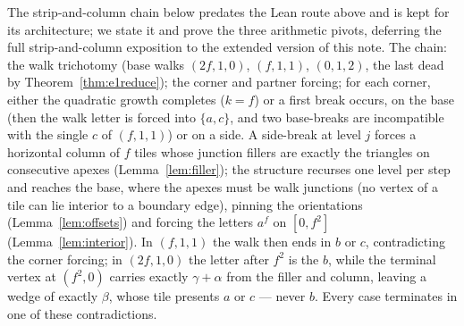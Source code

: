 \documentclass[11pt,reqno]{amsart}
\theoremstyle{plain}
\theoremstyle{definition}
\begin{document}
The strip-and-column chain below predates the Lean route above and is kept for its architecture;
we state it and prove the three
arithmetic pivots, deferring the full strip-and-column exposition to the extended version of this
note. The chain: the walk trichotomy (base walks $(2f,1,0)$, $(f,1,1)$, $(0,1,2)$, the last dead
by Theorem~\ref{thm:e1reduce}); the corner and partner forcing; for each corner, either the
quadratic growth completes ($k=f$) or a first break occurs, on the base (then the walk letter is
forced into $\{a,c\}$, and two base-breaks are incompatible with the single $c$ of $(f,1,1)$) or
on a side. A side-break at level $j$ forces a horizontal column of $f$ tiles whose junction
fillers are exactly the triangles on consecutive apexes (Lemma~\ref{lem:filler}); the structure
recurses one level per step and reaches the base, where the apexes must be walk junctions (no
vertex of a tile can lie interior to a boundary edge), pinning the orientations
(Lemma~\ref{lem:offsets}) and forcing the letters $a^f$ on $[0,f^2]$
(Lemma~\ref{lem:interior}). In $(f,1,1)$ the walk then ends in $b$ or $c$, contradicting the
corner forcing; in $(2f,1,0)$ the letter after $f^2$ is the $b$, while the terminal vertex at
$(f^2,0)$ carries exactly $\gamma+\alpha$ from the filler and column, leaving a wedge of exactly
$\beta$, whose tile presents $a$ or $c$ --- never $b$. Every case terminates in one of these
contradictions.
\end{document}
